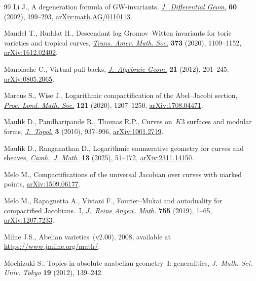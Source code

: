 \documentclass[pdftex]{sigma}
\numberwithin{equation}{section}
\theoremstyle{definition}
\begin{document}
\begin{thebibliography}{99}
Li J., A degeneration formula of {GW}-invariants,
 \href{https://doi.org/10.4310/jdg/1090351102}{\textit{J.~Differential Geom.}}
 \textbf{60} (2002), 199--293,
 \href{http://arxiv.org/abs/math.AG/0110113}{arXiv:math.AG/0110113}.

Mandel T., Ruddat H., Descendant log {G}romov--{W}itten invariants for toric
 varieties and tropical curves,
 \href{https://doi.org/10.1090/tran/7936}{\textit{Trans. Amer. Math. Soc.}}
 \textbf{373} (2020), 1109--1152,
 \href{http://arxiv.org/abs/1612.02402}{arXiv:1612.02402}.

Manolache C., Virtual pull-backs,
 \href{https://doi.org/10.1090/S1056-3911-2011-00606-1}{\textit{J.~Algebraic
 Geom.}} \textbf{21} (2012), 201--245,
 \href{http://arxiv.org/abs/0805.2065}{arXiv:0805.2065}.

Marcus S., Wise J., Logarithmic compactification of the {A}bel--{J}acobi
 section, \href{https://doi.org/10.1112/plms.12365}{\textit{Proc. Lond. Math.
 Soc.}} \textbf{121} (2020), 1207--1250,
 \href{http://arxiv.org/abs/1708.04471}{arXiv:1708.04471}.

Maulik D., Pandharipande R., Thomas R.P., Curves on~{$K3$} surfaces and modular
 forms, \href{https://doi.org/10.1112/jtopol/jtq030}{\textit{J.~Topol.}}
 \textbf{3} (2010), 937--996,
 \href{http://arxiv.org/abs/1001.2719}{arXiv:1001.2719}.

Maulik D., Ranganathan D., Logarithmic enumerative geometry for curves and
 sheaves, \href{https://doi.org/10.4310/cjm.250319031722}{\textit{Camb.~J.
 Math.}} \textbf{13} (2025), 51--172,
 \href{http://arxiv.org/abs/2311.14150}{arXiv:2311.14150}.

Melo M., Compactifications of the universal {J}acobian over curves with marked
 points, \href{http://arxiv.org/abs/1509.06177}{arXiv:1509.06177}.

Melo M., Rapagnetta A., Viviani F., Fourier--{M}ukai and autoduality for
 compactified {J}acobians.~{I},
 \href{https://doi.org/10.1515/crelle-2017-0009}{\textit{J.~Reine Angew.
 Math.}} \textbf{755} (2019), 1--65,
 \href{http://arxiv.org/abs/1207.7233}{arXiv:1207.7233}.

Milne J.S., Abelian varieties~(v2.00), 2008, {a}vailable at
 \url{https://www.jmilne.org/math/}.

Mochizuki S., Topics in absolute anabelian geometry~{I}: generalities,
 \textit{J.~Math. Sci. Univ. Tokyo} \textbf{19} (2012), 139--242.


\end{thebibliography}
\end{document}
